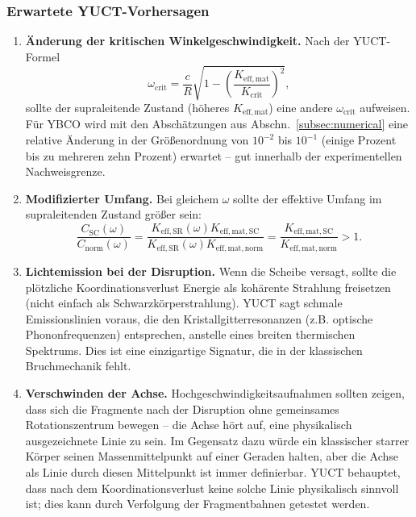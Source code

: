 \documentclass[12pt,a4paper]{article}
\begin{document}
	\subsubsection{Erwartete YUCT-Vorhersagen}
	
	\begin{enumerate}
		\item \textbf{Änderung der kritischen Winkelgeschwindigkeit.} Nach der YUCT-Formel
		\[
		\omega_{\text{crit}} = \frac{c}{R}\sqrt{1 - \left(\frac{K_{\mathrm{eff,mat}}}{K_{\mathrm{crit}}}\right)^2},
		\]
		sollte der supraleitende Zustand (höheres \(K_{\mathrm{eff,mat}}\)) eine andere \(\omega_{\text{crit}}\) aufweisen. Für YBCO wird mit den Abschätzungen aus Abschn.~\ref{subsec:numerical} eine relative Änderung in der Größenordnung von \(10^{-2}\) bis \(10^{-1}\) (einige Prozent bis zu mehreren zehn Prozent) erwartet – gut innerhalb der experimentellen Nachweisgrenze.
		
		\item \textbf{Modifizierter Umfang.} Bei gleichem \(\omega\) sollte der effektive Umfang im supraleitenden Zustand größer sein:
		\[
		\frac{C_{\text{SC}}(\omega)}{C_{\text{norm}}(\omega)} = \frac{K_{\mathrm{eff,SR}}(\omega) K_{\mathrm{eff,mat,SC}}}{K_{\mathrm{eff,SR}}(\omega) K_{\mathrm{eff,mat,norm}}} = \frac{K_{\mathrm{eff,mat,SC}}}{K_{\mathrm{eff,mat,norm}}} > 1.
		\]
		
		\item \textbf{Lichtemission bei der Disruption.} Wenn die Scheibe versagt, sollte die plötzliche Koordinationsverlust Energie als kohärente Strahlung freisetzen (nicht einfach als Schwarzkörperstrahlung). YUCT sagt schmale Emissionslinien voraus, die den Kristallgitterresonanzen (z.B. optische Phononfrequenzen) entsprechen, anstelle eines breiten thermischen Spektrums. Dies ist eine einzigartige Signatur, die in der klassischen Bruchmechanik fehlt.
		
		\item \textbf{Verschwinden der Achse.} Hochgeschwindigkeitsaufnahmen sollten zeigen, dass sich die Fragmente nach der Disruption ohne gemeinsames Rotationszentrum bewegen – die Achse hört auf, eine physikalisch ausgezeichnete Linie zu sein. Im Gegensatz dazu würde ein klassischer starrer Körper seinen Massenmittelpunkt auf einer Geraden halten, aber die Achse als Linie durch diesen Mittelpunkt ist immer definierbar. YUCT behauptet, dass nach dem Koordinationsverlust keine solche Linie physikalisch sinnvoll ist; dies kann durch Verfolgung der Fragmentbahnen getestet werden.
	\end{enumerate}
	
\end{document}
